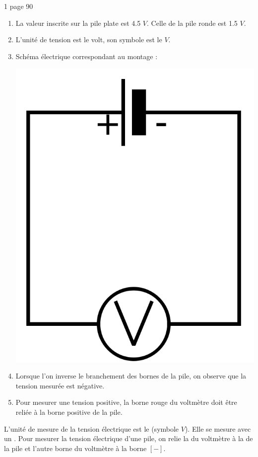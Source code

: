 \documentclass[12pt,a4paper]{article}
\begin{document}
\begin{myact}{1 page 90}
\begin{enumerate}
		\item La valeur inscrite sur la pile plate est \num{4.5} $V$. Celle de la pile ronde est \num{1.5} $V$.
		\item L'unité de tension est le volt, son symbole est le $V$.
		\item Schéma électrique correspondant au montage :\\ 
		\begin{center}
			\includegraphics[scale=0.15]{img/pile_volt}
		\end{center}		
		
		\item Lorsque l'on inverse le branchement des bornes de la pile, on observe que la tension mesurée est négative.
		\item Pour mesurer une tension positive, la borne rouge du voltmètre doit être reliée à la borne positive de la pile.
	\end{enumerate}
\end{myact}

\begin{mybilan}
	L'unité de mesure de la tension électrique est le  (symbole $V$). Elle se mesure avec un .
	Pour mesurer la tension électrique d'une pile, on relie la  du voltmètre à la  de la pile et l'autre borne du voltmètre à la borne $[-]$.
\end{mybilan}
\end{document}
